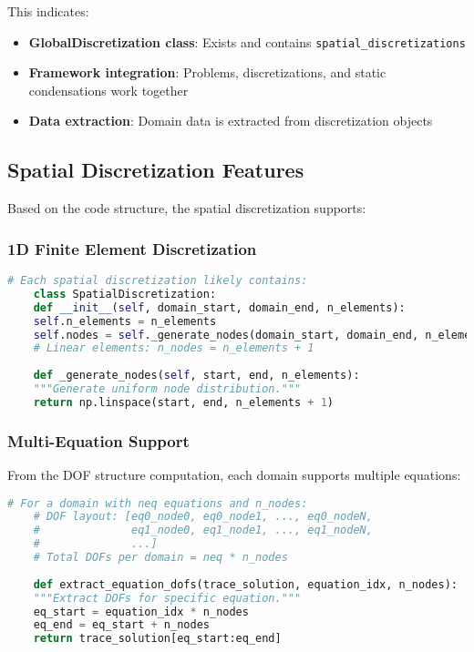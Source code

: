 This indicates:
\begin{itemize}
	\item \textbf{GlobalDiscretization class}: Exists and contains \texttt{spatial\_discretizations}
	\item \textbf{Framework integration}: Problems, discretizations, and static condensations work together
	\item \textbf{Data extraction}: Domain data is extracted from discretization objects
\end{itemize}

\subsection{Spatial Discretization Features}
\label{subsec:spatial_features}

Based on the code structure, the spatial discretization supports:

\subsubsection{1D Finite Element Discretization}

\begin{lstlisting}[language=Python, caption=1D Element Structure (inferred)]
	# Each spatial discretization likely contains:
	class SpatialDiscretization:
	def __init__(self, domain_start, domain_end, n_elements):
	self.n_elements = n_elements
	self.nodes = self._generate_nodes(domain_start, domain_end, n_elements)
	# Linear elements: n_nodes = n_elements + 1
	
	def _generate_nodes(self, start, end, n_elements):
	"""Generate uniform node distribution."""
	return np.linspace(start, end, n_elements + 1)
\end{lstlisting}

\subsubsection{Multi-Equation Support}

From the DOF structure computation, each domain supports multiple equations:

\begin{lstlisting}[language=Python, caption=Multi-Equation DOF Layout]
	# For a domain with neq equations and n_nodes:
	# DOF layout: [eq0_node0, eq0_node1, ..., eq0_nodeN, 
	#              eq1_node0, eq1_node1, ..., eq1_nodeN,
	#              ...]
	# Total DOFs per domain = neq * n_nodes
	
	def extract_equation_dofs(trace_solution, equation_idx, n_nodes):
	"""Extract DOFs for specific equation."""
	eq_start = equation_idx * n_nodes
	eq_end = eq_start + n_nodes
	return trace_solution[eq_start:eq_end]
\end{lstlisting}

